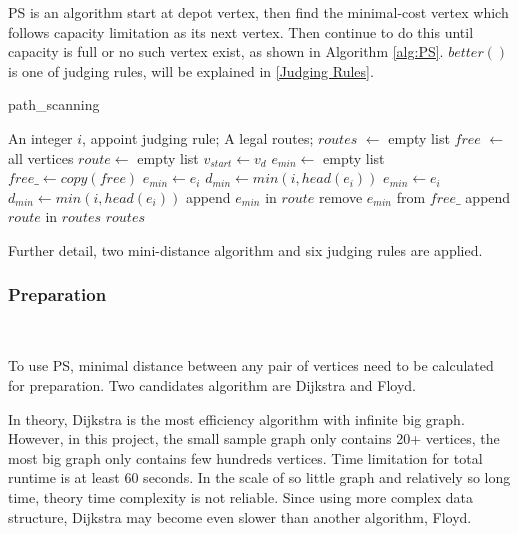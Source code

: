 \documentclass[journal]{IEEEtran}
\begin{document}
	PS is an algorithm start at depot vertex, then find the minimal-cost vertex which follows capacity limitation as its next vertex. Then continue to do this until capacity is full or no such vertex exist, as shown in Algorithm \ref{alg:PS}. $better()$ is one of judging rules, will be explained in \ref{Judging Rules}.
	
	\begin{algorithm}[htbp]
		\caption{path\_scanning}\label{alg:PS}
		\begin{algorithmic}
			\Require An integer $i$, appoint judging rule;
			\Ensure A legal routes;
			\newline
			\State $routes$ $\gets$ empty list
			\State $free$ $\gets$ all vertices
				\State $route \gets$ empty list
				\State $v_{start} \gets v_d$
					\State $e_{min} \gets$ empty list
					\State $free\_ \gets copy(free)$
								\State $e_{min} \gets e_i$
								\State $d_{min} \gets min(i, head(e_i))$
								\State $e_{min} \gets e_i$
								\State $d_{min} \gets min(i, head(e_i))$
							\EndIf
						\EndIf
					\EndFor
					\State append $e_{min}$ in $route$
					\State remove $e_{min}$ from $free\_$
				\EndWhile
				\State append $route$ in $routes$
			\EndWhile
			\Return $routes$
		\end{algorithmic}
	\end{algorithm}

	Further detail, two mini-distance algorithm and six judging rules are applied.
	
	\subsubsection{Preparation}
	\ 
	\indent
	
	To use PS, minimal distance between any pair of vertices need to be calculated for preparation. Two candidates algorithm are Dijkstra and Floyd.
	
	In theory, Dijkstra is the most efficiency algorithm with infinite big graph. However, in this project, the small sample graph only contains 20+ vertices, the most big graph only contains few hundreds vertices. Time limitation for total runtime is at least 60 seconds. In the scale of so little graph and relatively so long time, theory time complexity is not reliable. Since using more complex data structure, Dijkstra may become even slower than another algorithm, Floyd. 
	
\end{document}
